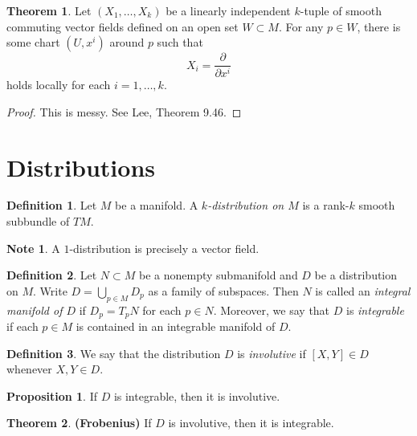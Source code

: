\documentclass[10pt,letterpaper,cm]{nupset}
\theoremstyle{definition}
\newtheorem*{definition}{Definition}
\newtheorem{theorem}{Theorem}
\newtheorem*{note}{Note}
\newtheorem{prop}{Proposition}
\newcommand{\1}{\mathbf{1}}
\newcommand{\0}{\vec 0}
\begin{document}
\begin{theorem}
Let $(X_1, \ldots, X_k)$ be a linearly independent $k$-tuple of smooth commuting vector fields defined on an open set $W\subset M$. For any $p\in W$, there is some chart $(U, x^i)$ around $p$ such that $$X_i = \frac{\partial}{\partial{x^i}}$$ holds locally for each $i=1, \ldots, k$.
\end{theorem}
\begin{proof}
This is messy. See Lee, Theorem 9.46.
\end{proof}

\section{Distributions}

\begin{definition}
Let $M$ be a manifold. A \textit{$k$-distribution on $M$} is a rank-$k$ smooth subbundle of $TM$.
\end{definition}
\begin{note}
A $1$-distribution is precisely a vector field. 
\end{note}

\begin{definition}
Let $N\subset M$ be a nonempty submanifold and $D$ be a distribution on $M$. Write $D = \bigcup_{p\in M}D_p$ as a family of subspaces. Then $N$ is called an \textit{integral manifold of $D$} if $D_p = T_pN$ for each $p\in N$. Moreover, we say that $D$ is \textit{integrable} if each $p\in M$ is contained in an integrable manifold of $D$.  
\end{definition}

\begin{definition}
We say that the distribution $D$ is \textit{involutive} if $[X,Y]\in D$ whenever $X,Y \in D$. 
\end{definition}

\begin{prop}
If $D$ is integrable, then it is involutive.
\end{prop}

\begin{theorem}{\textbf{(Frobenius)}}
If $D$ is involutive, then it is integrable. 
\end{theorem}
\end{document}
